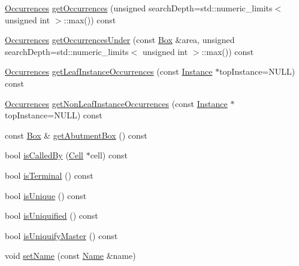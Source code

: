 \begin{DoxyCompactItemize}
\mbox{\hyperlink{namespaceHurricane_a1912927c128eee859af62dbe4cbe0a6b}{Occurrences}} \mbox{\hyperlink{classHurricane_1_1Cell_ab5bbab0a59106855d61deb94805e6115}{get\+Occurrences}} (unsigned search\+Depth=std\+::numeric\+\_\+limits$<$ unsigned int $>$\+::max()) const
\item 
\mbox{\hyperlink{namespaceHurricane_a1912927c128eee859af62dbe4cbe0a6b}{Occurrences}} \mbox{\hyperlink{classHurricane_1_1Cell_a7fb09c8e350923c47ce4c4407bdb00ce}{get\+Occurrences\+Under}} (const \mbox{\hyperlink{classHurricane_1_1Box}{Box}} \&area, unsigned search\+Depth=std\+::numeric\+\_\+limits$<$ unsigned int $>$\+::max()) const
\item 
\mbox{\hyperlink{namespaceHurricane_a1912927c128eee859af62dbe4cbe0a6b}{Occurrences}} \mbox{\hyperlink{classHurricane_1_1Cell_a7d5a16e085ef5375862560e3c3eb4ea8}{get\+Leaf\+Instance\+Occurrences}} (const \mbox{\hyperlink{classHurricane_1_1Instance}{Instance}} $\ast$top\+Instance=N\+U\+LL) const
\item 
\mbox{\hyperlink{namespaceHurricane_a1912927c128eee859af62dbe4cbe0a6b}{Occurrences}} \mbox{\hyperlink{classHurricane_1_1Cell_ac32e4f232a8fc030aa809fe6565d8d95}{get\+Non\+Leaf\+Instance\+Occurrences}} (const \mbox{\hyperlink{classHurricane_1_1Instance}{Instance}} $\ast$top\+Instance=N\+U\+LL) const
\item 
const \mbox{\hyperlink{classHurricane_1_1Box}{Box}} \& \mbox{\hyperlink{classHurricane_1_1Cell_a142360ca7b3c1c637894f5b9a2cac069}{get\+Abutment\+Box}} () const
\item 
bool \mbox{\hyperlink{classHurricane_1_1Cell_a239354e1b4ad9b751abf5a064e43b0e6}{is\+Called\+By}} (\mbox{\hyperlink{classHurricane_1_1Cell}{Cell}} $\ast$cell) const
\item 
bool \mbox{\hyperlink{classHurricane_1_1Cell_aac4e9218b7806f3a0f2d5a55f00abd69}{is\+Terminal}} () const
\item 
bool \mbox{\hyperlink{classHurricane_1_1Cell_a6c2f2fd9f6f6e0578937a90c0c37a507}{is\+Unique}} () const
\item 
bool \mbox{\hyperlink{classHurricane_1_1Cell_a86c21867e9ce896eae72fd2999ce8a2d}{is\+Uniquified}} () const
\item 
bool \mbox{\hyperlink{classHurricane_1_1Cell_a0220dbbbe730e6874f7620135e9c10f6}{is\+Uniquify\+Master}} () const
\item 
void \mbox{\hyperlink{classHurricane_1_1Cell_ad2c9face922062664110c66ee205eab2}{set\+Name}} (const \mbox{\hyperlink{classHurricane_1_1Name}{Name}} \&name)
\item 

\end{DoxyCompactItemize}
